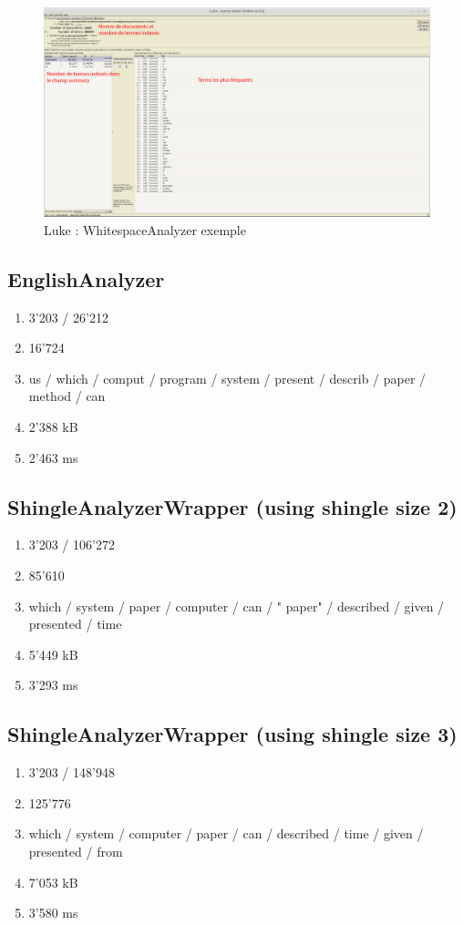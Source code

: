 \begin{figure}[H]
    \centering
    \includegraphics[width=1\linewidth, fbox]{img/Analyzers_White.png}
    \caption{Luke : WhitespaceAnalyzer exemple}
    \label{Analyzers_White}
\end{figure}

\subsection{EnglishAnalyzer}
\begin{enumerate}
    \item 3'203 / 26'212
    \item 16'724
    \item us / which / comput / program / system / present / describ / paper / method / can
    \item 2'388 kB
    \item 2'463 ms
\end{enumerate}

\subsection{ShingleAnalyzerWrapper (using shingle size 2)}
\begin{enumerate}
    \item 3'203 / 106'272
    \item 85'610
    \item which / system / paper / computer / can / " paper" / described / given / presented / time
    \item 5'449 kB
    \item 3'293 ms
\end{enumerate}

\subsection{ShingleAnalyzerWrapper (using shingle size 3)}
\begin{enumerate}
    \item 3'203 / 148'948
    \item 125'776
    \item which / system / computer / paper / can / described / time / given / presented / from
    \item 7'053 kB
    \item 3'580 ms
\end{enumerate}

